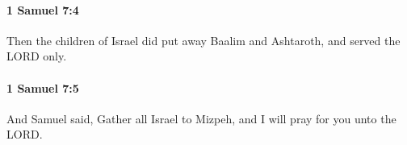 		\paragraph{1 Samuel 7:4} %
			\label{1SAMUEL-7-4}

			Then the children of Israel did put away Baalim and Ashtaroth, and served the LORD only.


		\paragraph{1 Samuel 7:5} %
			\label{1SAMUEL-7-5}

			And Samuel said, Gather all Israel to Mizpeh, and I will pray for you unto the LORD.


